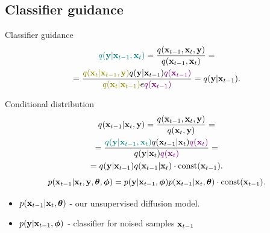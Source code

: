 \subsection{Classifier guidance}
\begin{frame}{Classifier guidance}
	\vspace{-0.5cm}
	\begin{multline*}
		{\color{teal}q(\by | \bx_{t - 1}, \bx_t)} = \frac{q(\bx_{t - 1}, \bx_t, \by)}{q(\bx_{t - 1}, \bx_t)} = \\
		= \frac{{\color{olive}q(\bx_t | \bx_{t - 1}, \by)} q(\by | \bx_{t - 1}) \color{violet}{q(\bx_{t - 1})}} {{\color{olive}q(\bx_t | \bx_{t - 1})}e \color{violet}{q(\bx_{t - 1})}} = q(\by | \bx_{t - 1}).
	\end{multline*}
	\vspace{-0.4cm}
	\begin{block}{Conditional distribution}
		\vspace{-0.7cm}
		\begin{multline*}
			q(\mathbf{x}_{t - 1} | \mathbf{x}_t, \mathbf{y}) = \frac{q(\mathbf{x}_{t - 1}, \mathbf{x}_t, \mathbf{y})}{q(\mathbf{x}_t, \mathbf{y})}  = \\ 
			=  \frac{{\color{teal}q(\mathbf{y} | \mathbf{x}_{t - 1}, \mathbf{x}_t)} q(\mathbf{x}_{t - 1} | \mathbf{x}_t) {\color{violet}q(\mathbf{x}_t)}}{q(\mathbf{y} | \mathbf{x}_t) {\color{violet}q(\mathbf{x}_t)}} = \\
			= q(\mathbf{y} | \mathbf{x}_{t - 1}) q(\mathbf{x}_{t - 1} | \mathbf{x}_t) \cdot \text{const}(\mathbf{x}_{t - 1}).
		\end{multline*}
		\[
			p(\mathbf{x}_{t - 1} | \mathbf{x}_t, \mathbf{y}, \boldsymbol{\theta} , \boldsymbol{\phi}) = p(\mathbf{y} | \mathbf{x}_{t-1}, \boldsymbol{\phi}) p(\mathbf{x}_{t-1} | \mathbf{x}_t, \boldsymbol{\theta}) \cdot \text{const}(\mathbf{x}_{t - 1}).
		\]
		\vspace{-0.4cm}
		\begin{itemize}
			\item $p(\mathbf{x}_{t-1} | \mathbf{x}_t, \boldsymbol{\theta})$ - our unsupervised diffusion model.
			\item $p(\mathbf{y} | \mathbf{x}_{t-1}, \boldsymbol{\phi})$ - classifier for noised samples $\mathbf{x}_{t-1}$
		\end{itemize}
	\end{block}
\end{frame}
